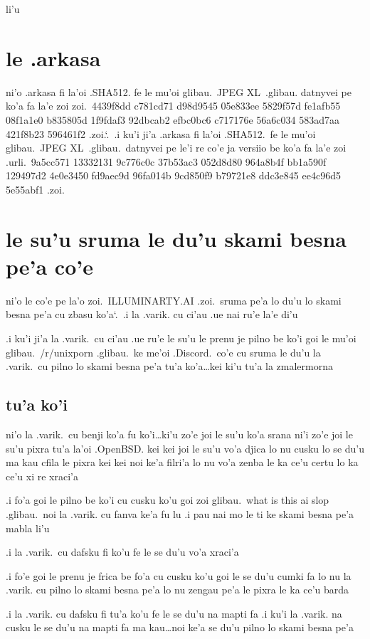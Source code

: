 \documentclass{report}
\newcommand\sds{\spacefactor\sfcode`.\ \space}
\begin{document}
li'u

\section{le .arkasa}
ni'o .arkasa fi la'oi .SHA512. fe le mu'oi glibau.\ JPEG XL\ .glibau. datnyvei pe ko'a fa la'e zoi zoi.\ 4439f8dd c781cd71 d98d9545 05e833ee 5829f57d fe1afb55 08f1a1e0 b835805d 1f9fdaf3 92dbcab2 efbc0bc6 c717176e 56a6c034 583ad7aa 421f8b23 596461f2 .zoi.\sds  .i ku'i ji'a .arkasa fi la'oi .SHA512.\ fe le mu'oi glibau.\ JPEG XL\ .glibau.\ datnyvei pe le'i re co'e ja versiio be ko'a fa la'e zoi .urli.\ 9a5cc571 13332131 9c776c0c 37b53ac3 052d8d80 964a8b4f bb1a590f 129497d2 4e0e3450 fd9aec9d 96fa014b 9cd850f9 b79721e8 ddc3e845 ee4c96d5 5e55abf1 .zoi.

\section{le su'u sruma le du'u skami besna pe'a co'e}
ni'o le co'e pe la'o zoi.\ ILLUMINARTY.AI .zoi.\ sruma pe'a lo du'u lo skami besna pe'a cu zbasu ko'a\sds  .i la .varik. cu ci'au .ue nai ru'e la'e di'u

.i ku'i ji'a la .varik.\ cu ci'au .ue ru'e le su'u le prenu je pilno be ko'i goi le mu'oi glibau.\ /r/unixporn .glibau.\ ke me'oi .Discord.\ co'e cu sruma le du'u la .varik.\ cu pilno lo skami besna pe'a tu'a ko'a\ldots kei ki'u tu'a la zmalermorna

\subsection{tu'a ko'i}
ni'o la .varik.\ cu benji ko'a fu ko'i\ldots ki'u zo'e joi le su'u ko'a srana ni'i zo'e joi le su'u pixra tu'a la'oi .OpenBSD. kei kei joi le su'u vo'a djica lo nu cusku lo se du'u ma kau cfila le pixra kei kei noi ke'a filri'a lo nu vo'a zenba le ka ce'u certu lo ka ce'u xi re xraci'a

.i fo'a goi le pilno be ko'i cu cusku ko'u goi zoi glibau.\ what is this ai slop .glibau.\ noi la .varik. cu fanva ke'a fu lu .i pau nai mo le ti ke skami besna pe'a mabla li'u

.i la .varik.\ cu dafsku fi ko'u fe le se du'u vo'a xraci'a

.i fo'e goi le prenu je frica be fo'a cu cusku ko'u goi le se du'u cumki fa lo nu la .varik. cu pilno lo skami besna pe'a lo nu zengau pe'a le pixra le ka ce'u barda

.i la .varik. cu dafsku fi tu'a ko'u fe le se du'u na mapti fa  .i ku'i la .varik. na cusku le se du'u na mapti fa ma kau\ldots noi ke'a se du'u pilno lo skami besna pe'a
\end{document}
